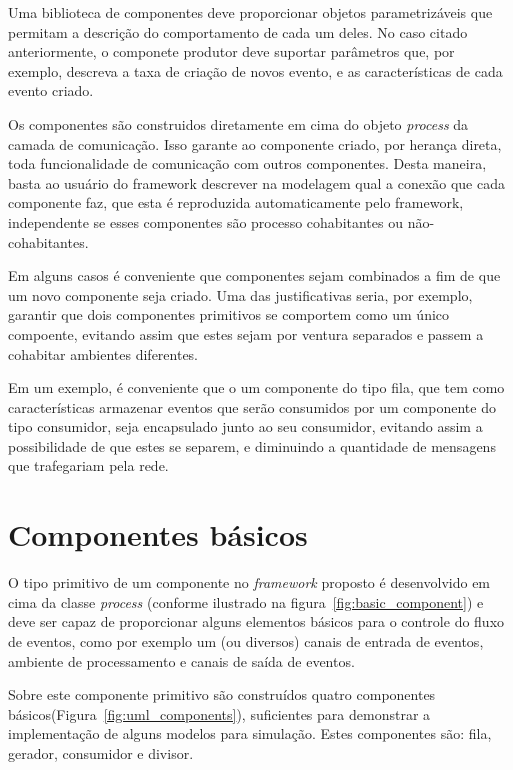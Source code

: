 Uma biblioteca de componentes deve proporcionar objetos parametrizáveis que permitam a descrição do comportamento de cada um deles. No caso citado anteriormente, o componete produtor deve suportar parâmetros que, por exemplo, descreva a taxa de criação de novos evento, e as características de cada evento criado.

Os componentes são construidos diretamente em cima do objeto \textit{process} da camada de comunicação. Isso garante ao componente criado, por herança direta, toda funcionalidade de comunicação com outros componentes. Desta maneira, basta ao usuário do framework descrever na modelagem qual a conexão que cada componente faz, que esta é reproduzida automaticamente pelo framework, independente se esses componentes são processo cohabitantes ou não-cohabitantes.

Em alguns casos é conveniente que componentes sejam combinados a fim de que um novo componente seja criado. Uma das justificativas seria, por exemplo, garantir que dois componentes primitivos se comportem como um único compoente, evitando assim que estes sejam por ventura separados e passem a cohabitar ambientes diferentes. 

Em um exemplo, é conveniente que o um componente do tipo fila, que tem como características armazenar eventos que serão consumidos por um componente do tipo consumidor, seja encapsulado junto ao seu consumidor, evitando assim a possibilidade de que estes se separem, e diminuindo a quantidade de mensagens que trafegariam pela rede.

\section{Componentes básicos}

O tipo primitivo de um componente no \textit{framework} proposto é desenvolvido em cima da classe \textit{process} (conforme ilustrado na figura~\ref{fig:basic_component}) e deve ser capaz de proporcionar alguns elementos básicos para o controle do fluxo de eventos, como por exemplo um (ou diversos) canais de entrada de eventos, ambiente de processamento e canais de saída de eventos.

Sobre este componente primitivo são construídos quatro componentes básicos(Figura~\ref{fig:uml_components}), suficientes para demonstrar a implementação de alguns modelos para simulação. Estes componentes são: fila, gerador, consumidor e divisor.

